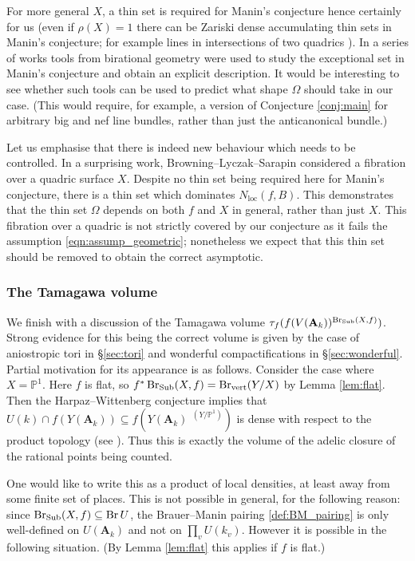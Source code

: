 \documentclass[a4paper,12pt,reqno]{amsart}
\numberwithin{equation}{section} \numberwithin{figure}{section}
\DeclareMathOperator{\Br}{Br} \DeclareMathOperator{\Brnr}{Br_{nr}}
\DeclareMathOperator{\BrV}{Br_{vert}}
\renewcommand\P{\mathbb{P}}
\newcommand{\Adele}{\mathbf{A}}
\renewcommand{\#}{\sharp}
\theoremstyle{definition}
\numberwithin{lemma}{section}
\begin{document}
For more general $X$, a thin set is required for Manin's conjecture hence certainly for us (even if $\rho(X) = 1$ there can be Zariski dense accumulating thin sets in Manin's conjecture; for example lines in intersections of two quadrics \cite[Ex.~3.6]{BL17}). In a series of works \cite{LT17,LST22} tools from birational geometry were used to study the exceptional set in Manin's conjecture and obtain an explicit description. It would be interesting to see whether such tools can be used to predict what shape $\Omega$ should take in our case. (This would require, for example, a version of Conjecture \ref{conj:main} for arbitrary big and nef line bundles, rather than just the anticanonical bundle.)

Let us emphasise that there is indeed new behaviour which needs to be controlled. In a surprising work, Browning--Lyczak--Sarapin \cite{arXiv:2203.06881} considered a fibration over a quadric surface $X$. Despite no thin set being required here for Manin's conjecture, there is a thin set which dominates $N_{\textrm{loc}}(f,B)$. This demonstrates that the thin set $\Omega$  depends on both $f$ and $X$ in general, rather than just $X$. This fibration over a quadric is not strictly covered by our conjecture as it fails the assumption \eqref{eqn:assump_geometric}; nonetheless we expect that this thin set should be removed to obtain the correct asymptotic.%

\subsubsection{The Tamagawa volume}
We finish with a discussion of the Tamagawa volume $\tau_f(f(V(\Adele_k))^{\Sub(X,f)})$.  Strong evidence for this being the correct volume is given by the case of aniostropic tori in \S \ref{sec:tori} and wonderful compactifications in \S \ref{sec:wonderful}. Partial motivation for its appearance is as follows. Consider the case where $X = \P^1$. Here $f$ is  flat, so $f^*\Sub(X,f) = \BrV(Y/X)$ by Lemma \ref{lem:flat}. Then the Harpaz--Wittenberg conjecture implies that 	$U(k) \cap f(Y(\Adele_k)) \subseteq f(Y(\Adele_k)^{\BrV(Y/\P^1)})$ is dense with respect to the product topology (see \cite[Thm.~13.2.16]{Brauer}). Thus this is exactly the volume of the adelic closure of the rational	points being counted.

One would like to write this as a product of local densities, at least away from some finite set of places. This is not possible in general, for the following reason: since $\Sub(X,f) \subseteq \Br U$, the Brauer--Manin pairing \eqref{def:BM_pairing} is only well-defined on $U(\Adele_k)$ and not on $\prod_v U(k_v)$. However it is possible in the following situation. (By Lemma \ref{lem:flat} this applies if $f$ is flat.)
\end{document}
